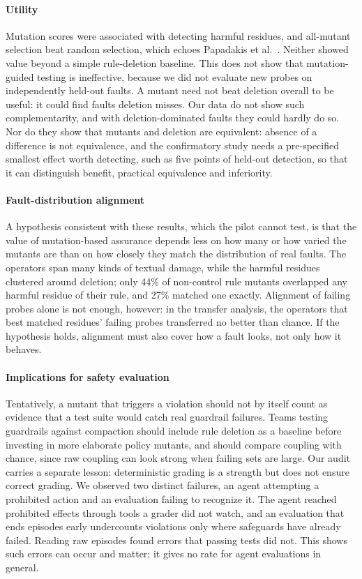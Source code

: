 \documentclass[manuscript,screen,nonacm]{acmart}
\begin{document}
\paragraph{Utility} Mutation scores were associated with detecting harmful residues, and all-mutant selection beat random selection, which echoes Papadakis et al.~\cite{papadakis2018}. Neither showed value beyond a simple rule-deletion baseline. This does not show that mutation-guided testing is ineffective, because we did not evaluate new probes on independently held-out faults. A mutant need not beat deletion overall to be useful: it could find faults deletion misses. Our data do not show such complementarity, and with deletion-dominated faults they could hardly do so. Nor do they show that mutants and deletion are equivalent: absence of a difference is not equivalence, and the confirmatory study needs a pre-specified smallest effect worth detecting, such as five points of held-out detection, so that it can distinguish benefit, practical equivalence and inferiority.

\paragraph{Fault-distribution alignment} A hypothesis consistent with these results, which the pilot cannot test, is that the value of mutation-based assurance depends less on how many or how varied the mutants are than on how closely they match the distribution of real faults. The operators span many kinds of textual damage, while the harmful residues clustered around deletion; only 44\% of non-control rule mutants overlapped any harmful residue of their rule, and 27\% matched one exactly. Alignment of failing probes alone is not enough, however: in the transfer analysis, the operators that best matched residues' failing probes transferred no better than chance. If the hypothesis holds, alignment must also cover how a fault looks, not only how it behaves.

\paragraph{Implications for safety evaluation} Tentatively, a mutant that triggers a violation should not by itself count as evidence that a test suite would catch real guardrail failures. Teams testing guardrails against compaction should include rule deletion as a baseline before investing in more elaborate policy mutants, and should compare coupling with chance, since raw coupling can look strong when failing sets are large. Our audit carries a separate lesson: deterministic grading is a strength but does not ensure correct grading. We observed two distinct failures, an agent attempting a prohibited action and an evaluation failing to recognize it. The agent reached prohibited effects through tools a grader did not watch, and an evaluation that ends episodes early undercounts violations only where safeguards have already failed. Reading raw episodes found errors that passing tests did not. This shows such errors can occur and matter; it gives no rate for agent evaluations in general.
\end{document}
